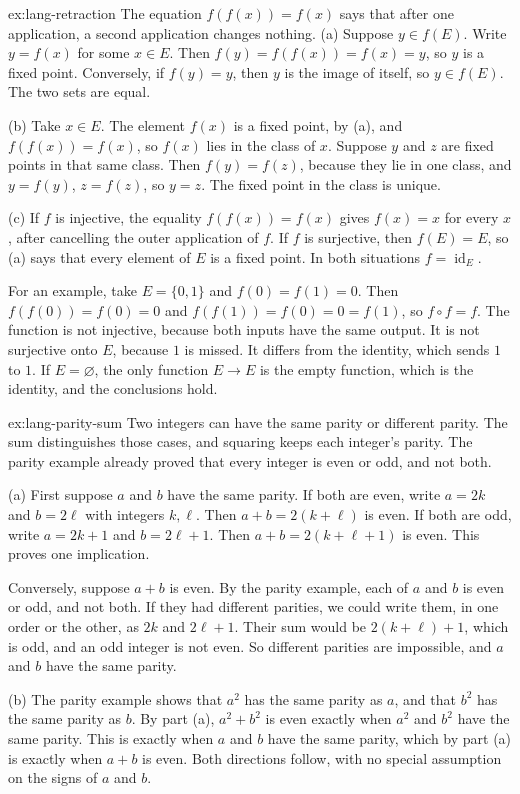 \begin{solution}{ex:lang-retraction}
\idea The equation $f(f(x))=f(x)$ says that after one application, a second application changes nothing.
\writeup (a) Suppose $y\in f(E)$. Write $y=f(x)$ for some $x\in E$. Then $f(y)=f(f(x))=f(x)=y$, so $y$ is a fixed point. Conversely, if $f(y)=y$, then $y$ is the image of itself, so $y\in f(E)$. The two sets are equal.

(b) Take $x\in E$. The element $f(x)$ is a fixed point, by (a), and $f(f(x))=f(x)$, so $f(x)$ lies in the class of $x$. Suppose $y$ and $z$ are fixed points in that same class. Then $f(y)=f(z)$, because they lie in one class, and $y=f(y)$, $z=f(z)$, so $y=z$. The fixed point in the class is unique.

(c) If $f$ is injective, the equality $f(f(x))=f(x)$ gives $f(x)=x$ for every $x$, after cancelling the outer application of $f$. If $f$ is surjective, then $f(E)=E$, so (a) says that every element of $E$ is a fixed point. In both situations $f=\operatorname{id}_E$.

For an example, take $E=\{0,1\}$ and $f(0)=f(1)=0$. Then $f(f(0))=f(0)=0$ and $f(f(1))=f(0)=0=f(1)$, so $f\circ f=f$. The function is not injective, because both inputs have the same output. It is not surjective onto $E$, because $1$ is missed. It differs from the identity, which sends $1$ to $1$. If $E=\varnothing$, the only function $E\to E$ is the empty function, which is the identity, and the conclusions hold.
\end{solution}

\begin{solution}{ex:lang-parity-sum}
\idea Two integers can have the same parity or different parity. The
sum distinguishes those cases, and squaring keeps each integer's parity.
The parity example already proved that every integer is even or odd, and
not both.

\writeup (a) First suppose $a$ and $b$ have the same parity. If both
are even, write $a=2k$ and $b=2\ell$ with integers $k,\ell$. Then
$a+b=2(k+\ell)$ is even. If both are odd, write $a=2k+1$ and
$b=2\ell+1$. Then $a+b=2(k+\ell+1)$ is even. This proves one
implication.

Conversely, suppose $a+b$ is even. By the parity example, each of $a$
and $b$ is even or odd, and not both. If they had different parities,
we could write them, in one order or the other, as $2k$ and $2\ell+1$.
Their sum would be $2(k+\ell)+1$, which is odd, and an odd integer is
not even. So different parities are impossible, and $a$ and $b$ have
the same parity.

(b) The parity example shows that $a^2$ has the same parity as $a$, and
that $b^2$ has the same parity as $b$. By part (a), $a^2+b^2$ is even
exactly when $a^2$ and $b^2$ have the same parity. This is exactly when
$a$ and $b$ have the same parity, which by part (a) is exactly when
$a+b$ is even. Both directions follow, with no special assumption on
the signs of $a$ and $b$.
\end{solution}

